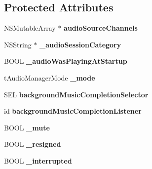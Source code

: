 \subsection*{Protected Attributes}
\begin{DoxyCompactItemize}
\item 
\hypertarget{interface_c_d_audio_manager_a617ca716e96fdd1e8d481982f9df7df2}{N\-S\-Mutable\-Array $\ast$ {\bfseries audio\-Source\-Channels}}\label{interface_c_d_audio_manager_a617ca716e96fdd1e8d481982f9df7df2}

\item 
\hypertarget{interface_c_d_audio_manager_a21709238bb6f0c125867e761937dd2fb}{N\-S\-String $\ast$ {\bfseries \-\_\-audio\-Session\-Category}}\label{interface_c_d_audio_manager_a21709238bb6f0c125867e761937dd2fb}

\item 
\hypertarget{interface_c_d_audio_manager_a6b102ac1022cab5d35d5e486cd527fc6}{B\-O\-O\-L {\bfseries \-\_\-audio\-Was\-Playing\-At\-Startup}}\label{interface_c_d_audio_manager_a6b102ac1022cab5d35d5e486cd527fc6}

\item 
\hypertarget{interface_c_d_audio_manager_a1ecb484491427443f47cf1d810d20fd4}{t\-Audio\-Manager\-Mode {\bfseries \-\_\-mode}}\label{interface_c_d_audio_manager_a1ecb484491427443f47cf1d810d20fd4}

\item 
\hypertarget{interface_c_d_audio_manager_a9c9bd976a757b6b4d8851ec6dd03be6e}{S\-E\-L {\bfseries background\-Music\-Completion\-Selector}}\label{interface_c_d_audio_manager_a9c9bd976a757b6b4d8851ec6dd03be6e}

\item 
\hypertarget{interface_c_d_audio_manager_a96ab8a0fa9e3480356ad4a6173bc3d4c}{id {\bfseries background\-Music\-Completion\-Listener}}\label{interface_c_d_audio_manager_a96ab8a0fa9e3480356ad4a6173bc3d4c}

\item 
\hypertarget{interface_c_d_audio_manager_a67d4323ad0b7fb59f96375b39c0f3480}{B\-O\-O\-L {\bfseries \-\_\-mute}}\label{interface_c_d_audio_manager_a67d4323ad0b7fb59f96375b39c0f3480}

\item 
\hypertarget{interface_c_d_audio_manager_a9f6929916f5ba0807262d100045ac512}{B\-O\-O\-L {\bfseries \-\_\-resigned}}\label{interface_c_d_audio_manager_a9f6929916f5ba0807262d100045ac512}

\item 
\hypertarget{interface_c_d_audio_manager_a69aa8f86be0608f599fead7368fb8133}{B\-O\-O\-L {\bfseries \-\_\-interrupted}}\label{interface_c_d_audio_manager_a69aa8f86be0608f599fead7368fb8133}


\end{DoxyCompactItemize}
